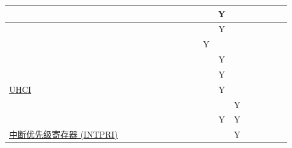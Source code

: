 \documentclass[main\_\_CN.tex]{subfiles}
\begin{document}
\begin{landscape}
\begin{tiny}
\begin{longtable}[c]{|m{3cm}|c|c|c|c|c|c|c|C{1.4cm}|c|c|c|c|c|c|c|c|c| }
     &  &  &  &  &  &  &  &  &  &  &  Y &  &  &  &  &  &  \\ \hline
     &  &  &  &  &  &  &  &  &  &  &  Y &  &  &  &  &  &  \\ \hline
     &  &  &  &  &  &  &  &  &  &  Y &  &  &  &  &  &  &  \\ \hline
     &  &  &  &  &  &  &  &  &  &  &  Y &  &  &  &  &  &  \\ \hline
     &  &  &  &  &  &  &  &  &  &  &  Y &  &  &  &  &  &  \\ \hline
    \hyperref[mod:uart]{UHCI} &  &  &  &  &  &  &  &  &  &  &  Y &  &  &  &  &  &  \\ \hline
     &  &  &  &  &  &  &  &  &  &  &  &  Y &  &  &  &  &  \\ \hline
      &  &  &  &  &  &  &  &  &  &  & Y & Y &  &  &  &  &  \\ \hline
    \hyperref[mod:riscvcpu]{中断优先级寄存器 (INTPRI)} &  &  &  &  &  &  &  &  &  &  &  & Y &  &  &  &  &  \\ \hline
\end{longtable}


\begin{longtable}[c]{|m{1.7cm}|c|c|c|c|c|c|c|c|C{1.5cm}|c|c|c|c|c|c|c|c|c| }


\end{longtable}
\end{tiny}
\end{landscape}
\end{document}
